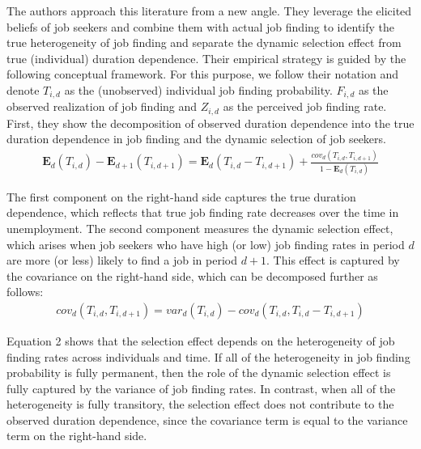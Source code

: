 \documentclass[11pt,a4paper,leqno]{article}
\begin{document}
The authors approach this literature from a new angle. They leverage the elicited beliefs of job seekers and combine them with actual job finding to identify the true heterogeneity of job finding and separate the dynamic selection effect from true (individual) duration dependence. Their empirical strategy is guided by the following conceptual framework. For this purpose, we follow their notation and denote $T_{i,d}$ as the (unobserved) individual job finding probability. $F_{i,d}$ as the observed realization of job finding and $Z_{i,d}$ as the perceived job finding rate. First, they show the decomposition of observed duration dependence into the true duration dependence in job finding and the dynamic selection of job seekers. 
\begin{align}
	\mathbf{E}_d (T_{i,d}) - \mathbf{E}_{d+1} (T_{i,d+1}) = \mathbf{E}_d (T_{i,d} - T_{i,d+1}) + \frac{cov_d (T_{i,d},T_{i,d+1})}{1 - \mathbf{E}_d (T_{i,d})}
\end{align}

The first component on the right-hand side captures the true duration dependence, which reflects that true job finding rate decreases over the time in unemployment. 
The second component measures the dynamic selection effect, which arises when job seekers who have high (or low) job finding rates in period $d$ are more (or less) likely to find a job in period $d+1$. This effect is captured by the covariance on the right-hand side, which can be decomposed further as follows:
\begin{align}
	cov_d (T_{i,d},T_{i,d+1}) = var_d (T_{i,d}) -  cov_d (T_{i,d},T_{i,d} - T_{i,d+1})
\end{align}

Equation 2 shows that the selection effect depends on the heterogeneity of job finding rates across individuals and time. If all of the heterogeneity in job finding probability is fully permanent, then the role of the dynamic selection effect is fully captured by the variance of job finding rates. In contrast, when all of the heterogeneity is fully transitory, the selection effect does not contribute to the observed duration dependence, since the covariance term is equal to the variance term on the right-hand side.
\end{document}
